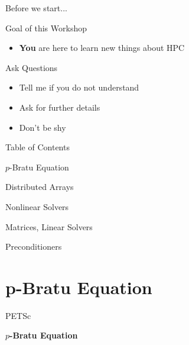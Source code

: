 


\begin{frame}{Before we start...}

   \begin{block}{Goal of this Workshop}
    \begin{itemize}
     \item {\Huge \textbf{\color{red} You}} are here to learn new things about HPC
    \end{itemize}
   \end{block}

   \vspace*{1cm}
   \begin{block}{Ask Questions}
    \begin{itemize}
     \item Tell me if you do not understand
     \item Ask for further details
     \item Don't be shy
    \end{itemize}
   \end{block}

\end{frame}




\begin{frame}{Table of Contents}
   \begin{block}{$p$-Bratu Equation} \end{block}
   \begin{block}{Distributed Arrays} \end{block}
   \begin{block}{Nonlinear Solvers} \end{block}
   \begin{block}{Matrices, Linear Solvers} \end{block}
   \begin{block}{Preconditioners} \end{block}
\end{frame}



%
%   





%
%
\section{p-Bratu Equation}
\begin{frame}{PETSc}
   \begin{center} \Large \textbf{$p$-Bratu Equation} \end{center}
\end{frame}

